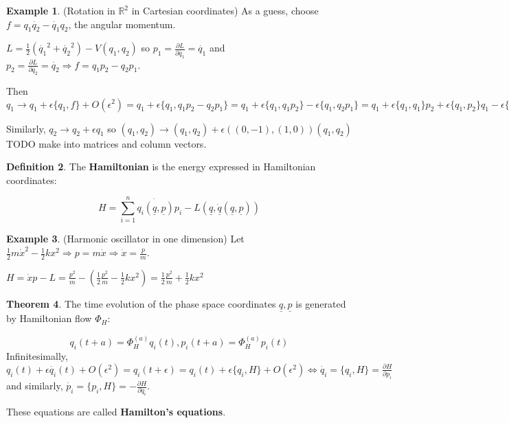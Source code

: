 \documentclass[12pt,a4paper]{article}
\theoremstyle{definition}
\newtheorem{definition}{Definition}[subsection]
\newtheorem{theorem}[definition]{Theorem}
\newtheorem{example}[definition]{Example}
\begin{document}
\begin{example}
	(Rotation in $\mathbb{R}^2$ in Cartesian coordinates) As a guess, choose $f = q_1 \dot{q_2} - \dot{q_1} q_2$, the angular momentum.

	$L = \frac{1}{2} (\dot{q_1}^2 + \dot{q_2}^2) - V(q_1, q_2)$ so $p_1 = \frac{\partial L}{\partial \dot{q_1}} = \dot{q_1}$ and $p_2 = \frac{\partial L}{\partial \dot{q_2}} = \dot{q_2} \Rightarrow f = q_1 p_2 - q_2 p_1$.

	Then $q_1 \rightarrow q_1 + \epsilon \{ q_1, f \} + O(\epsilon^2) = q_1 + \epsilon \{ q_1, q_1 p_2 - q_2 p_1 \} = q_1 + \epsilon \{ q_1, q_1 p_2 \} - \epsilon \{ q_1, q_2 p_1 \} = q_1 + \epsilon \{q_1, q_1\} p_2 + \epsilon \{q_1, p_2\} q_1 - \epsilon \{q_1, q_2\} p_1 - \epsilon \{q_1, p_1\} q_2 = q_1 - \epsilon q_2$

	Similarly, $q_2 \rightarrow q_2 + \epsilon q_1$ so $(q_1, q_2) \rightarrow (q_1, q_2) + \epsilon ((0, -1), (1, 0)) (q_1, q_2)$ TODO make into matrices and column vectors.
\end{example}

\begin{definition}
	The \textbf{Hamiltonian} is the energy expressed in Hamiltonian coordinates:

	\[ H = \sum_{i = 1}^n \dot{q_i(\underline{q}, \underline{p})} p_i - L(\underline{q}, \dot{\underline{q}} (\underline{q}, \underline{p})) \]
\end{definition}

\begin{example}
	(Harmonic oscillator in one dimension) Let $\frac{1}{2} m \dot{x}^2 - \frac{1}{2} k x^2 \Rightarrow p = m\dot{x} \Rightarrow \dot{x} = \frac{p}{m}$.

	$H = \dot{x} p - L = \frac{p^2}{m} - (\frac{1}{2} \frac{p^2}{m} - \frac{1}{2} k x^2) = \frac{1}{2} \frac{p^2}{m} + \frac{1}{2} k x^2$
\end{example}

\begin{theorem}
	The time evolution of the phase space coordinates $\underline{q}, \underline{p}$ is generated by Hamiltonian flow $\Phi_H$:

	\[ q_i(t + a) = \Phi_H^{(a)} q_i(t), p_i(t + a) = \Phi_H^{(a)} p_i(t) \]
	Infinitesimally, $q_i(t) + \epsilon \dot{q_i}(t) + O(\epsilon^2) = q_i(t + \epsilon) = q_i(t) + \epsilon \{ q_i, H \} + O(\epsilon^2) \Leftrightarrow \dot{q_i} = \{q_i, H \} = \frac{\partial H}{\partial p_i}$ and similarly, $\dot{p_i} = \{ p_i, H \} = -\frac{\partial H}{\partial q_i}$.
	
	These equations are called \textbf{Hamilton's equations}.
\end{theorem}
\end{document}
